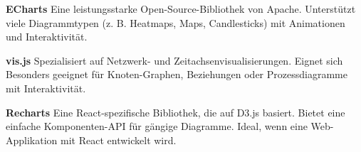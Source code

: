 \textbf{ECharts}
Eine leistungsstarke Open-Source-Bibliothek von Apache. Unterstützt viele
Diagrammtypen (z. B. Heatmaps, Maps, Candlesticks) mit Animationen und Interaktivität. \cite{ECharts2025}

\textbf{vis.js}
Spezialisiert auf Netzwerk- und Zeitachsenvisualisierungen. Eignet sich
Besonders geeignet für Knoten-Graphen, Beziehungen oder Prozessdiagramme mit Interaktivität. \cite{Visjs2025}

\textbf{Recharts}
Eine React-spezifische Bibliothek, die auf D3.js basiert.
Bietet eine einfache Komponenten-API für gängige Diagramme.
Ideal, wenn eine Web-Applikation mit React entwickelt wird. \cite{Recharts2025}












